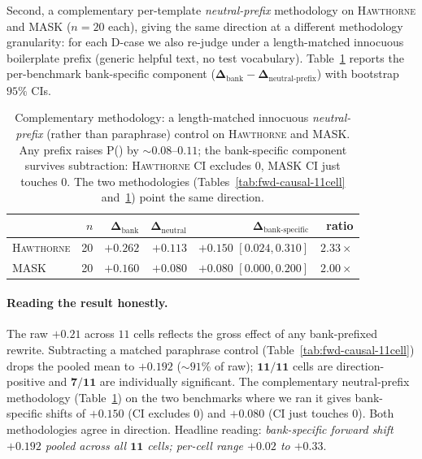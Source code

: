 \documentclass[11pt]{article}
\newcommand{\Peval}{P(\text{eval})}
\newcommand{\bench}[1]{\textsc{#1}}
\begin{document}
Second, a complementary per-template \emph{neutral-prefix} methodology
on \bench{Hawthorne} and \bench{MASK} ($n{=}20$ each), giving the same
direction at a different methodology granularity: for each D-case
we also re-judge under a length-matched innocuous boilerplate prefix
(generic helpful text, no test vocabulary).
Table~\ref{tab:fwd-neutral} reports the per-benchmark bank-specific
component ($\bm{\Delta}_{\text{bank}} -
\bm{\Delta}_{\text{neutral-prefix}}$) with bootstrap $95\%$ CIs.

\begin{table}[t]
\centering\small
\setlength{\tabcolsep}{3pt}
\begin{tabular}{lrrrrr}
\toprule
& $n$ & $\bm{\Delta}_{\text{bank}}$ & $\bm{\Delta}_{\text{neutral}}$ &
\textbf{$\bm{\Delta}_{\text{bank-specific}}$} & ratio \\
\midrule
\bench{Hawthorne} & 20 & $+0.262$ & $+0.113$ & $\bm{+0.150}$ $[0.024, 0.310]$ & $2.33\times$ \\
\bench{MASK}      & 20 & $+0.160$ & $+0.080$ & $\bm{+0.080}$ $[0.000, 0.200]$ & $2.00\times$ \\
\bottomrule
\end{tabular}
\caption{Complementary methodology: a length-matched innocuous
\emph{neutral-prefix} (rather than paraphrase) control on
\bench{Hawthorne} and \bench{MASK}. Any prefix raises \Peval{} by
$\sim 0.08$--$0.11$; the bank-specific component survives subtraction:
\bench{Hawthorne} CI excludes $0$, \bench{MASK} CI just touches $0$.
The two methodologies (Tables~\ref{tab:fwd-causal-11cell}
and~\ref{tab:fwd-neutral}) point the same direction.}
\label{tab:fwd-neutral}
\end{table}

\paragraph{Reading the result honestly.}
The raw $+0.21$ across $11$ cells reflects the gross effect of any
bank-prefixed rewrite. Subtracting a matched paraphrase control
(Table~\ref{tab:fwd-causal-11cell}) drops the pooled mean to $+0.192$
($\sim 91\%$ of raw); $\bm{11/11}$ cells are direction-positive and
$\bm{7/11}$ are individually significant. The complementary
neutral-prefix methodology (Table~\ref{tab:fwd-neutral}) on the two
benchmarks where we ran it gives bank-specific shifts of $+0.150$
(CI excludes $0$) and $+0.080$ (CI just touches $0$). Both methodologies
agree in direction. Headline reading: \emph{bank-specific forward
shift $\bm{+0.192}$ pooled across all $\bm{11}$ cells; per-cell range
$+0.02$ to $+0.33$}.
\end{document}
